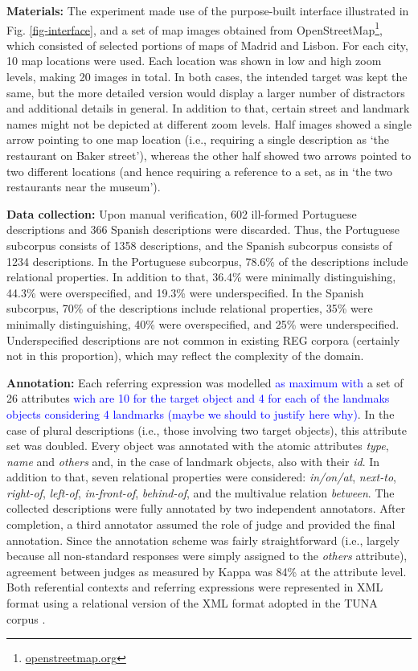 \documentclass[11pt]{article}
\begin{document}
{\bf Materials:} The experiment made use of the purpose-built interface illustrated in Fig. \ref{fig-interface}, and a set of map images obtained from OpenStreetMap\footnote{\url{openstreetmap.org}}, which consisted of selected portions of maps of Madrid and Lisbon. For each city, 10 map locations were used. Each location was shown in low and high zoom levels, making 20 images in total. In both cases, the intended target was kept the same, but the more detailed version would display a larger number of distractors and additional details in general. In addition to that, certain street and landmark names might not be depicted at different zoom levels. Half images showed a single arrow pointing to one map location (i.e., requiring a single description as `the restaurant on Baker street'), whereas the other half showed two arrows pointed to two different locations (and hence requiring a reference to a set, as in `the two restaurants near the museum'). 

{\bf Data collection:} Upon manual verification, 602 ill-formed Portuguese descriptions and 366 Spanish descriptions were discarded. Thus, the Portuguese subcorpus consists of 1358 descriptions, and the Spanish subcorpus consists of 1234 descriptions. In the Portuguese subcorpus, 78.6\% of the descriptions include relational properties. In addition to that, 36.4\% were minimally distinguishing, 44.3\% were overspecified, and  19.3\% were underspecified. In the Spanish subcorpus, 70\% of the descriptions include relational properties, 35\% were minimally distinguishing, 40\% were overspecified, and 25\% were underspecified. Underspecified descriptions are not common in existing REG corpora (certainly not in this proportion), which may reflect the complexity of the domain.

{\bf Annotation:} Each referring expression was modelled \textcolor{blue}{as maximum with} a set of 26 attributes \textcolor{blue}{wich are 10 for the target object and 4 for each of the landmaks objects considering 4 landmarks (maybe we should to justify here why)}. In the case of plural descriptions (i.e., those involving two target objects), this attribute set was doubled. Every object was annotated with the atomic attributes {\em type}, {\em name} and {\em others} and, in the case of landmark objects, also with their {\em id}. In addition to that, seven relational properties were considered: {\em in/on/at}, {\em next-to}, {\em right-of}, {\em left-of}, {\em in-front-of}, {\em behind-of}, and the multivalue relation {\em between}. The collected descriptions were fully annotated by two independent annotators. After completion, a third annotator assumed the role of judge and provided the final annotation. Since the annotation scheme was fairly straightforward (i.e., largely because all non-standard responses were simply assigned to the {\em others} attribute), agreement between judges as measured by Kappa \cite{kappa} was 84\% at the attribute level. Both referential contexts and referring expressions were represented in XML format using a relational version of the XML format adopted in the TUNA corpus \cite{tuna-corpus}. 
\end{document}

